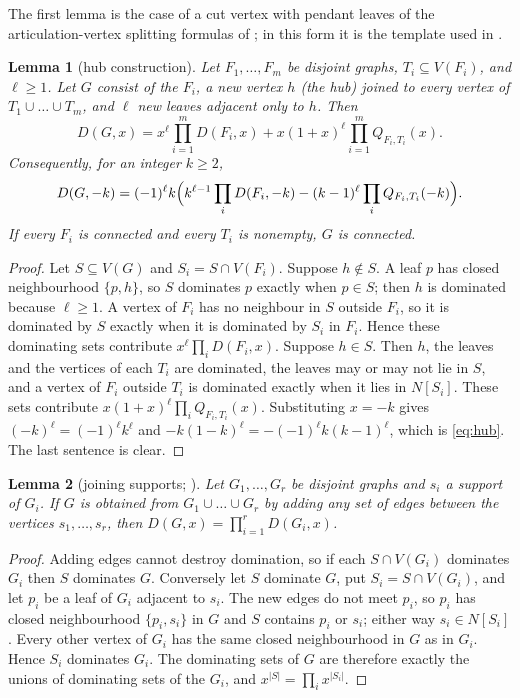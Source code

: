 \documentclass[11pt]{amsart}
\newtheorem{lemma}{Lemma}
\theoremstyle{remark}
\begin{document}
The first lemma is the case of a cut vertex with pendant leaves of the
articulation-vertex splitting formulas of \cite[Section~4]{KPSTT12}; in this form
it is the template used in \cite{MA26}.

\begin{lemma}[hub construction]\label{lem:hub}
Let $F_1,\dots,F_m$ be disjoint graphs, $T_i\subseteq V(F_i)$, and $\ell\ge 1$.
Let $G$ consist of the $F_i$, a new vertex $h$ (the hub) joined to every
vertex of $T_1\cup\dots\cup T_m$, and $\ell$ new leaves adjacent only to $h$.
Then
\[
  D(G,x)=x^{\ell}\prod_{i=1}^m D(F_i,x)+x(1+x)^{\ell}\prod_{i=1}^m Q_{F_i,T_i}(x).
\]
Consequently, for an integer $k\ge 2$,
\begin{equation}\label{eq:hub}
  D(G,-k)=(-1)^{\ell}k\Bigl(k^{\ell-1}\prod_i D(F_i,-k)-(k-1)^{\ell}\prod_i Q_{F_i,T_i}(-k)\Bigr).
\end{equation}
If every $F_i$ is connected and every $T_i$ is nonempty, $G$ is connected.
\end{lemma}

\begin{proof}
Let $S\subseteq V(G)$ and $S_i=S\cap V(F_i)$. Suppose $h\notin S$. A leaf $p$
has closed neighbourhood $\{p,h\}$, so $S$ dominates $p$ exactly when $p\in S$;
then $h$ is dominated because $\ell\ge1$. A vertex of $F_i$ has no neighbour in
$S$ outside $F_i$, so it is dominated by $S$ exactly when it is dominated by
$S_i$ in $F_i$. Hence these dominating sets contribute
$x^{\ell}\prod_i D(F_i,x)$. Suppose $h\in S$. Then $h$, the leaves and the
vertices of each $T_i$ are dominated, the leaves may or may not lie in $S$,
and a vertex of $F_i$ outside $T_i$ is dominated exactly when it lies in
$N[S_i]$. These sets contribute $x(1+x)^{\ell}\prod_i Q_{F_i,T_i}(x)$.
Substituting $x=-k$ gives $(-k)^{\ell}=(-1)^{\ell}k^{\ell}$ and
$-k(1-k)^{\ell}=-(-1)^{\ell}k(k-1)^{\ell}$, which is \eqref{eq:hub}. The last
sentence is clear.
\end{proof}

\begin{lemma}[joining supports; {\cite[Theorems~3.10, 3.11]{KPSTT12}}]\label{lem:join}
Let $G_1,\dots,G_r$ be disjoint graphs and $s_i$ a support of $G_i$. If $G$ is
obtained from $G_1\cup\dots\cup G_r$ by adding any set of edges between the
vertices $s_1,\dots,s_r$, then $D(G,x)=\prod_{i=1}^r D(G_i,x)$.
\end{lemma}

\begin{proof}
Adding edges cannot destroy domination, so if each $S\cap V(G_i)$ dominates
$G_i$ then $S$ dominates $G$. Conversely let $S$ dominate $G$, put
$S_i=S\cap V(G_i)$, and let $p_i$ be a leaf of $G_i$ adjacent to $s_i$. The new
edges do not meet $p_i$, so $p_i$ has closed neighbourhood $\{p_i,s_i\}$ in $G$
and $S$ contains $p_i$ or $s_i$; either way $s_i\in N[S_i]$. Every other vertex
of $G_i$ has the same closed neighbourhood in $G$ as in $G_i$. Hence $S_i$
dominates $G_i$. The dominating sets of $G$ are therefore exactly the unions of
dominating sets of the $G_i$, and $x^{|S|}=\prod_i x^{|S_i|}$.
\end{proof}
\end{document}
